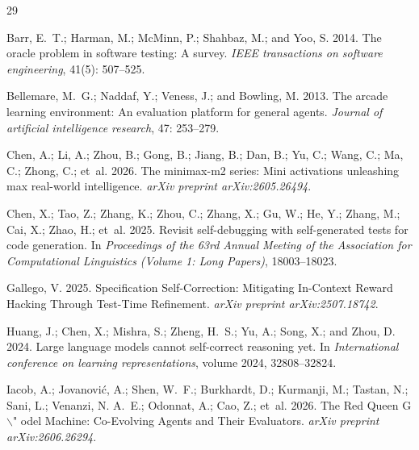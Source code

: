 \documentclass[letterpaper]{article} \usepackage{aaai2027}  \usepackage[hyphens]{url}  \usepackage{graphicx} \urlstyle{rm} \def\UrlFont{\rm}  \usepackage{natbib}  \usepackage{caption} \usepackage{amsfonts} \usepackage{multirow} \frenchspacing  \usepackage{algorithm}
\begin{document}
\begin{thebibliography}{29}
\providecommand{\natexlab}[1]{#1}

Barr, E.~T.; Harman, M.; McMinn, P.; Shahbaz, M.; and Yoo, S. 2014.
\newblock The oracle problem in software testing: A survey.
\newblock \emph{IEEE transactions on software engineering}, 41(5): 507--525.

Bellemare, M.~G.; Naddaf, Y.; Veness, J.; and Bowling, M. 2013.
\newblock The arcade learning environment: An evaluation platform for general
  agents.
\newblock \emph{Journal of artificial intelligence research}, 47: 253--279.

Chen, A.; Li, A.; Zhou, B.; Gong, B.; Jiang, B.; Dan, B.; Yu, C.; Wang, C.; Ma,
  C.; Zhong, C.; et~al. 2026.
\newblock The minimax-m2 series: Mini activations unleashing max real-world
  intelligence.
\newblock \emph{arXiv preprint arXiv:2605.26494}.

Chen, X.; Tao, Z.; Zhang, K.; Zhou, C.; Zhang, X.; Gu, W.; He, Y.; Zhang, M.;
  Cai, X.; Zhao, H.; et~al. 2025.
\newblock Revisit self-debugging with self-generated tests for code generation.
\newblock In \emph{Proceedings of the 63rd Annual Meeting of the Association
  for Computational Linguistics (Volume 1: Long Papers)}, 18003--18023.

Gallego, V. 2025.
\newblock Specification Self-Correction: Mitigating In-Context Reward Hacking
  Through Test-Time Refinement.
\newblock \emph{arXiv preprint arXiv:2507.18742}.

Huang, J.; Chen, X.; Mishra, S.; Zheng, H.~S.; Yu, A.; Song, X.; and Zhou, D.
  2024.
\newblock Large language models cannot self-correct reasoning yet.
\newblock In \emph{International conference on learning representations},
  volume 2024, 32808--32824.

Iacob, A.; Jovanovi{\'c}, A.; Shen, W.~F.; Burkhardt, D.; Kurmanji, M.; Tastan,
  N.; Sani, L.; Venanzi, N. A.~E.; Odonnat, A.; Cao, Z.; et~al. 2026.
\newblock The Red Queen G$\backslash$" odel Machine: Co-Evolving Agents and
  Their Evaluators.
\newblock \emph{arXiv preprint arXiv:2606.26294}.


\end{thebibliography}
\end{document}

